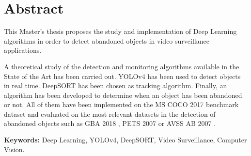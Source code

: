 
\chapter*{Abstract}
\label{cha:abstract}

\noindent
This Master's thesis proposes the study and implementation of Deep Learning algorithms in order to detect abandoned objects in video surveillance applications.

A theoretical study of the detection and monitoring algorithms available in the State of the Art has been carried out. YOLOv4 \cite{bochkovskiy2020yolov4} has been used to detect objects in real time. DeepSORT \cite{Wojke2017simple} has been chosen as tracking algorithm. Finally, an algorithm has been developed to determine when an object has been abandoned or not. All of them have been implemented on the MS COCO 2017 benchmark dataset \cite{lin2015microsoft} and evaluated on the most relevant datasets in the detection of abandoned objects such as GBA 2018 \cite{gba-dataset}, PETS 2007 \cite{pets2007-dataset} or AVSS AB 2007 \cite{AVSSAB2007-dataset}.

\textbf{Keywords:} Deep Learning, YOLOv4, DeepSORT, Video Surveillance, Computer Vision.